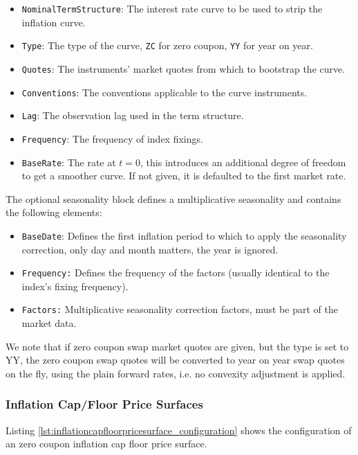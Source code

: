 \documentclass[12pt, a4paper]{article}
\begin{document}
\begin{itemize}
\item {\tt NominalTermStructure}: The interest rate curve to be used to strip the inflation curve.
\item {\tt Type}: The type of the curve, {\tt ZC} for zero coupon, {\tt YY} for year on year.
\item {\tt Quotes}: The instruments' market quotes from which to bootstrap the curve.
\item {\tt Conventions}: The conventions applicable to the curve instruments.
\item {\tt Lag}: The observation lag used in the term structure.
\item {\tt Frequency}: The frequency of index fixings.
\item {\tt BaseRate}: The rate at $t=0$, this introduces an additional degree of freedom to get a smoother curve. If not
  given, it is defaulted to the first market rate.
\end{itemize}

The optional seasonality block defines a multiplicative seasonality and contains the following elements:

\begin{itemize}
\item {\tt BaseDate}: Defines the first inflation period to which to apply the seasonality correction, only day and
  month matters, the year is ignored.
\item {\tt Frequency:} Defines the frequency of the factors (usually identical to the index's fixing frequency).
\item {\tt Factors:} Multiplicative seasonality correction factors, must be part of the market data.
\end{itemize}

We note that if zero coupon swap market quotes are given, but the type is set to YY, the zero coupon swap quotes will be
converted to year on year swap quotes on the fly, using the plain forward rates, i.e. no convexity adjustment is
applied.

\subsubsection{Inflation Cap/Floor Price Surfaces}

Listing \ref{lst:inflationcapfloorpricesurface_configuration} shows the configuration of an zero coupon inflation cap
floor price surface.
\end{document}
